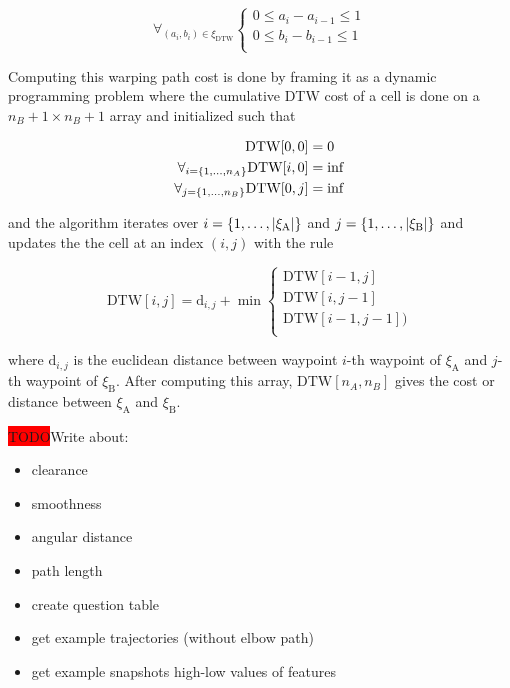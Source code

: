 \documentclass[letterpaper, 10 pt, conference]{ieeeconf}  %
\newcommand{\todo}{\colorbox{red}{TODO}}
\newcommand{\tj}[1]{\ensuremath{\xi_\text{#1}}}
\begin{document}
\begin{equation}
\forall_{(a_i,b_i) \in \xi_\text{DTW}} 
  \begin{cases}
      0 \leq a_{i} - a_{i-1} \leq 1 \\
      0 \leq b_{i} - b_{i-1} \leq 1 \\
  \end{cases}
\end{equation}

Computing this warping path cost is done by framing it as a dynamic programming problem where the cumulative DTW cost of a cell is done on a $n_B+1 \times n_B+1$ array and initialized such that

\begin{equation}
\begin{aligned}
\text{DTW}[0,0] &= 0 \\
\forall_{i=\{1,\mathellipsis,n_A\}} \text{DTW}[i,0] &= \inf\\
\forall_{j=\{1,\mathellipsis,n_B\}} \text{DTW}[0,j] &= \inf\\
\end{aligned}
\end{equation}

and the algorithm iterates over $i=\{1,\mathellipsis,|\tj{A}|\}$ and $j=\{1,\mathellipsis,|\tj{B}|\}$ and updates the the cell at an index $(i,j)$ with the rule

\begin{equation}
\text{DTW}[i,j] = \text{d}_{i,j} + \min 
  \begin{cases}
    \text{DTW}[i-1,j] \\
    \text{DTW}[i,j-1] \\
    \text{DTW}[i-1,j-1] ) \\
  \end{cases}
\end{equation}

where $\text{d}_{i,j}$ is the euclidean distance between waypoint $i$-th waypoint of \tj{A} and $j$-th waypoint of \tj{B}. After computing this array, $\text{DTW}[n_A, n_B]$ gives the cost or distance between \tj{A} and \tj{B}.

\todo Write about:
\begin{itemize}
\item clearance
\item smoothness
\item angular distance
\item path length
\item create question table
\item get example trajectories (without elbow path)
\item get example snapshots high-low values of features
\end{itemize}
\end{document}
